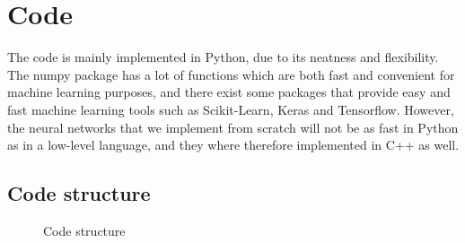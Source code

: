 \section{Code} \label{sec:code}
The code is mainly implemented in Python, due to its neatness and flexibility. The numpy package has a lot of functions which are both fast and convenient for machine learning purposes, and there exist some packages that provide easy and fast machine learning tools such as Scikit-Learn, Keras and Tensorflow. However, the neural networks that we implement from scratch will not be as fast in Python as in a low-level language, and they where therefore implemented in C++ as well. 

\subsection{Code structure} \label{sec:structure}

\begin{figure}
\centering
{}
\caption{Code structure}
\label{fig:codestructure}
\end{figure}

